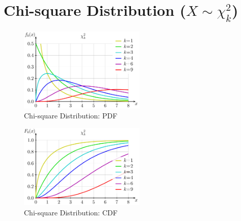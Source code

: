 \chapter{Chi-square Distribution ($X \sim \chi^2_k$) \cite{ism-1,wiki/Chi-squared_distribution}} \label{Chi-square Distribution}

\begin{table}[H]
    \begin{minipage}{0.49\linewidth}
        \begin{figure}[H]
            \centering
            \includegraphics[width=\linewidth, height=4cm, keepaspectratio]{Pictures/distributions/Chi-square_pdf.jpg}
            \caption{Chi-square Distribution: PDF}
        \end{figure}
    \end{minipage}
    \hfill
    \begin{minipage}{0.49\linewidth}
        \begin{figure}[H]
            \centering
            \includegraphics[width=\linewidth, height=4cm, keepaspectratio]{Pictures/distributions/Chi-square_cdf.jpg}
            \caption{Chi-square Distribution: CDF}
        \end{figure}
    \end{minipage}
\end{table}

